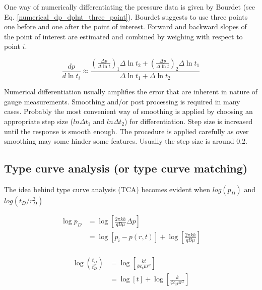 \documentclass{llncs}
\numberwithin{equation}{section}
\numberwithin{figure}{section}
\numberwithin{table}{section}
\begin{document}
    One way of numerically differentiating the pressure data is given by Bourdet\cite{Bourdet_2002_1} (see Eq. \ref{numerical_dp_dplnt_three_point}). Bourdet suggests to use three points one before and one after the point of interest. Forward and backward slopes of the point of interest are estimated and combined by weighing with respect to point $i$.

    \begin{equation}
        \frac{dp}{d\ln {{t}_{i}}}\approx \frac{{{\left( \frac{\Delta p}{\Delta \ln t} \right)}_{1}}\Delta \ln {{t}_{2}}+{{\left( \frac{\Delta p}{\Delta \ln t} \right)}_{2}}\Delta \ln {{t}_{1}}}{\Delta \ln {{t}_{1}}+\Delta \ln {{t}_{2}}}
        \label{numerical_dp_dplnt_three_point}
    \end{equation}

    Numerical differentiation usually amplifies the error that are inherent in nature of gauge measurements. Smoothing and/or post processing is required in many cases. Probably the most convenient way of smoothing is applied by choosing an appropriate step size ($ln\Delta t_{1}$ and $ln\Delta t_{2}$) for differentiation. Step size is increased until the response is smooth enough. The procedure is applied carefully as over smoothing may some hinder some features. Usually the step size is around 0.2.

    \subsection{Type curve analysis (or type curve matching)}
    The idea behind type curve analysis (TCA) becomes evident when  $log(p_{D})$ and $log(t_{D}/r_{D}^{2})$ 

    \begin{equation}
    \begin{split}
     \log {{p}_{D}}&=\log \left[ \frac{2\pi kh}{qB\mu }\Delta p \right] \\
    & =\log \left[ {{p}_{i}}-p\left( r,t \right) \right]+\log \left[ \frac{2\pi kh}{qB\mu } \right] \\
    \end{split}
        \label{logpD_1}
    \end{equation}

    \begin{equation}
    \begin{split}
     \log \left( \frac{{{t}_{D}}}{t_{D}^{2}} \right)&=\log \left[ \frac{kt}{\phi {{c}_{t}}\mu {{r}^{2}}} \right] \\
    & =\log \left[ t \right]+\log \left[ \frac{k}{\phi {{c}_{t}}\mu {{r}^{2}}} \right] \\
    \end{split}
        \label{logpD_2}
    \end{equation}
\end{document}
